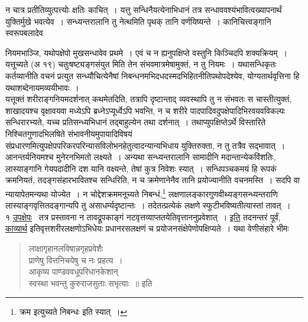 \documentclass[11pt, openany]{book}
\begin{document}
\noindent
न चात्र प्रतीतिव्युत्पत्त्योः क्षतिः काचित्~। यत्तु सन्धिनैयत्येनाभिधानं तत्र सन्धाववश्यंभावित्वख्यापनार्थं युक्तिर्मुखे भवत्येव~। सन्ध्यन्तरालानि तु नेत्थमिति पृथक् तानि वर्णयिष्यन्ते~। कानिचित्त्वङ्गानि स्वरूपबलादेव

\newpage

\noindent
नियमभाञ्जि, यथोपक्षेपो मुखसन्धावेव प्रथमे~। एवं च न ह्यनुपक्षिप्ते वस्तुनि किञ्चिदपि शक्यक्रियम्~। यत्तूच्यते {\qt (अ १९) चतुःषष्ट्यङ्गसंयुत} मिति तेन संभवमात्रमेषामुक्तं, न तु नियमः~। यथासन्धिकृतः कर्तव्यानीति वचनं प्रत्युत सन्ध्यौचित्येनैषां निबन्धनमभिदधदस्मदभिहितनीतिपथोपदेश्येव, योग्यतार्थवृत्तिना हि यथाशब्देनायमव्ययीभावः~।\\

यत्तूक्तं शरीराङ्गनियमदर्शनात् कथमेतदिति, तत्रापि दृष्टान्ताद् व्यवस्थापि तु न संभवतः स चास्तीत्युक्तं, शाखादयश्च वृक्षावयवा मध्येऽपि ब्रध्नेऽप्यूर्ध्वेऽपि भवन्ति, न च शरीरे पादपादिवदुपक्षेपादिभिरवयवविकल्पः सन्धिरारभ्यते, यच्च प्रतिसन्ध्यभिधानं तद्बाहुल्येन तथा दर्शनात्~। तथाप्युपक्षिप्तेऽर्थे विस्तारिते निश्चितगुणादभिलषिते संभावनीयमुपायादिविषयं संप्रधारणमित्युपक्षेपपरिकरपरिन्यासविलोभनहेतुत्वादन्यान्यभिधाय युक्तिरुक्ता, न तु तत्रैव सद्भावात्~। आनन्तर्यनियमश्च मुनेरनभिमतो लक्ष्यते~। अन्यथा सन्ध्यन्तरालानि सामादीनि मदान्तान्येकविंशतिः, लास्याङ्गानि गेयपदादीनि दश यानि वक्ष्यन्ते, तेषां कुत्र निवेशः स्यात्~। सन्धिपञ्चकमयं हि रूपकं क्रमनियतं, तदङ्गसंहारभावितश्च सन्धिरिति, न च क्रमेणानेनैव तानि प्रयोज्यानीति वचनमस्ति~। सदपि वा न्यायापेतमन्यथा योज्येत~। न चोद्देशक्रममनूच्यते निबन्धं,\renewcommand{\thefootnote}{*}\footnote{{\qt क्रम इत्युच्यते निबन्धः} इति स्यात्~।} लक्षणालङ्कारगुणवीथ्यङ्गसन्ध्यन्तराणि लास्याङ्गवृत्तितदङ्गान्यपि तु असाधर्म्यदृष्टान्तः~। तदेतत्प्रत्येकं लक्षणे स्फुटीभविष्यतीत्यास्तां तावत्~।\\

१ \underline{उपक्षेपः} \textendash\ तत्र प्रस्तावना न तावद्रूपकाङ्गं नटवृत्तव्याप्ततयेतिवृत्ताननुप्रवेशात्~। \underline{इति} तदनन्तरं पूर्वं, \underline{काव्यार्थ} इतिवृत्तशरीरलक्षणोऽभिधेयः प्रधानरसलक्षणं च प्रयोजनसंक्षेपेणोपक्षिप्यते~। यथा वेणीसंहारे भीमः \textendash

\begin{quote}
{\qt लाक्षागृहानलविषान्नगृहप्रवेशैः\\
प्राणेषु वित्तनिचयेषु च नः प्रहत्य~।\\
आकृष्य पाण्डववधूपरिधानकेशान्\\
स्वस्था भवन्तु कुरुराजसुताः सभृत्याः~॥} इति
\end{quote}

\newpage
\end{document}

